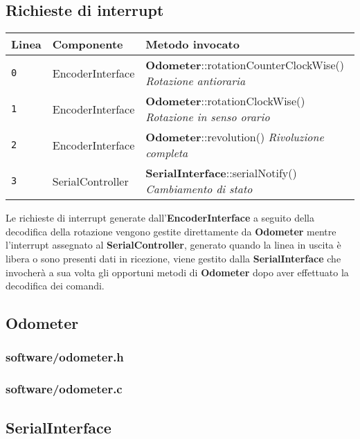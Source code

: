 \documentclass [11pt,a4paper,oneside]{paper}
\newcommand{\component}[1]{\textbf{#1}}
\newcommand{\inputC}[1]{}
\begin{document}
\inputC{software/memory_map.h}

\subsection{Richieste di interrupt}
\begin{tabular}{|l|l|l|}
\hline
Linea & Componente & Metodo invocato \\
\hline
\texttt{0} & EncoderInterface & \component{Odometer}::rotationCounterClockWise()
                                \textit{Rotazione antioraria} \\
\hline
\texttt{1} & EncoderInterface & \component{Odometer}::rotationClockWise()
                                \textit{Rotazione in senso orario} \\
\hline
\texttt{2} & EncoderInterface & \component{Odometer}::revolution()
                                \textit{Rivoluzione completa} \\
\hline
\texttt{3} & SerialController & \component{SerialInterface}::serialNotify()
                                \textit{Cambiamento di stato} \\
\hline
\end{tabular}

\vspace{1em}

Le richieste di interrupt generate dall'\component{EncoderInterface}
a seguito della decodifica della rotazione vengono gestite direttamente
da \component{Odometer} mentre l'interrupt assegnato al
\component{SerialController}, generato quando la linea in uscita è libera
o sono presenti dati in ricezione, viene gestito dalla
\component{SerialInterface} che invocherà a sua volta gli opportuni metodi
di \component{Odometer} dopo aver effettuato la decodifica dei comandi.

\subsection{Odometer}
\subsubsection{software/odometer.h}
\inputC{software/odometer.h}
\subsubsection{software/odometer.c}
\inputC{software/odometer.c}

\subsection{SerialInterface}
\end{document}
